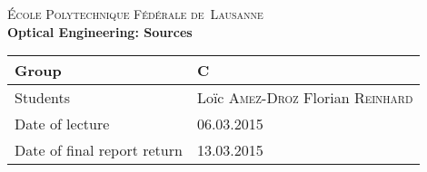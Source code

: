 \begin{titlepage}
\begin{center}
    \textsc{\LARGE École Polytechnique Fédérale de~Lausanne}\\[1.5cm] 
    {\huge \bfseries Optical Engineering: Sources}\\[0.4cm] 
    \begin{tabular}{|p{5cm}|p{4cm}|}
        \hline
        Group & C \\ \hline
        Students & Loïc \textsc{Amez-Droz} \newline Florian \textsc{Reinhard} \\ \hline
        Date of lecture & 06.03.2015 \\ \hline
        Date of final report return & 13.03.2015 \\ \hline
    \end{tabular}
\end{center}


\begin{abstract}
    This study deals with the spatial properties of three light sources (halogen, LED and laser).
The first experience determines the diameters of the sources using the camera lens (in order of appearance \SI{3.51}{\milli\meter} \SI{3.25}{\milli\meter} and \SI{0.78}{\milli\meter}).
Next the same with a 4f system (with f = \SI{12}{\milli\meter} lens: \SI{3.26}{\milli\meter}, \SI{2.81}{\milli\meter}, \SI{0.04}{\milli\meter}).
The second experience illustrates the \emph{brightness theorem}.
The last experience is about the emitting properties of the polarizer and IR filter.
We end with an emitting intensity compare between with and without IR filter halogen source.
\end{abstract}
 
\vfill
\end{titlepage}
